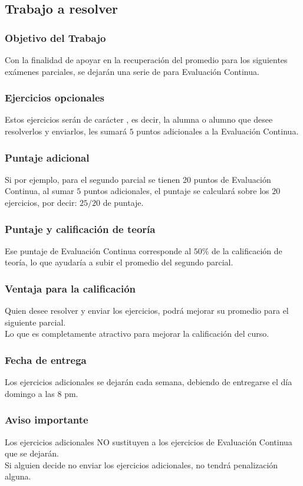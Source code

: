 \documentclass[14pt]{beamer}
\begin{document}
\subsection{Trabajo a resolver}

\begin{frame}
\frametitle{Objetivo del Trabajo}
Con la finalidad de apoyar en la recuperación del promedio para los siguientes exámenes parciales, \pause se dejarán una serie de  para Evaluación Continua.
\end{frame}
\begin{frame}
\frametitle{Ejercicios opcionales}
Estos ejercicios serán de carácter , \pause es decir, la alumna o alumno que desee resolverlos y enviarlos, les sumará $5$ puntos adicionales a la Evaluación Continua.
\end{frame}
\begin{frame}
\frametitle{Puntaje adicional}
Si por ejemplo, para el segundo parcial se tienen 20 puntos de Evaluación Continua, \pause al sumar $5$ puntos adicionales, el puntaje se calculará sobre los $20$ ejercicios, \pause por decir: \pause $25/20$ de puntaje.
\end{frame}
\begin{frame}
\frametitle{Puntaje y calificación de teoría}
Ese puntaje de Evaluación Continua corresponde al $50\%$ de la calificación de teoría, \pause lo que ayudaría a subir el promedio del segundo parcial.
\end{frame}
\begin{frame}
\frametitle{Ventaja para la calificación}
Quien desee resolver y enviar los ejercicios, podrá mejorar su promedio para el siguiente parcial.
\\
\bigskip
Lo que es completamente atractivo para mejorar la calificación del curso.
\end{frame}
\begin{frame}
\frametitle{Fecha de entrega}
Los ejercicios adicionales se dejarán cada semana, \pause debiendo de entregarse el día domingo a las 8 pm.
\end{frame}
\begin{frame}
\frametitle{Aviso importante}
Los ejercicios adicionales NO sustituyen a los ejercicios de Evaluación Continua que se dejarán.
\\
\bigskip
\pause
Si alguien decide no enviar los ejercicios adicionales, no tendrá penalización alguna.
\end{frame}
\end{document}
